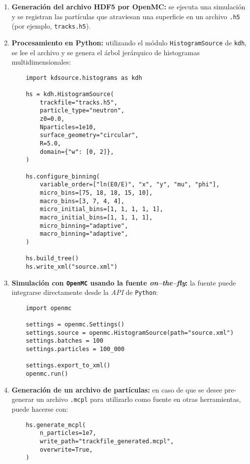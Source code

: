 \begin{enumerate}
    \item \textbf{Generación del archivo HDF5 por OpenMC:} se ejecuta una simulación y se registran las partículas que atraviesan una superficie en un archivo \texttt{.h5} (por ejemplo, \texttt{tracks.h5}).

    \item \textbf{Procesamiento en Python:} utilizando el módulo \texttt{HistogramSource} de \texttt{kdh}, se lee el archivo y se genera el árbol jerárquico de histogramas multidimensionales:
    
    \begin{verbatim}
    import kdsource.histograms as kdh

    hs = kdh.HistogramSource(
        trackfile="tracks.h5",
        particle_type="neutron",
        z0=0.0,
        Nparticles=1e10,
        surface_geometry="circular",
        R=5.0,
        domain={"w": [0, 2]},
    )

    hs.configure_binning(
        variable_order=["ln(E0/E)", "x", "y", "mu", "phi"],
        micro_bins=[75, 18, 18, 15, 10],
        macro_bins=[3, 7, 4, 4],
        micro_initial_bins=[1, 1, 1, 1, 1],
        macro_initial_bins=[1, 1, 1, 1],
        micro_binning="adaptive",
        macro_binning="adaptive",
    )

    hs.build_tree()
    hs.write_xml("source.xml")
    \end{verbatim}

    \item \textbf{Simulación con \texttt{OpenMC} usando la fuente \textit{on–the–fly}:} la fuente puede integrarse directamente desde la \textit{API} de \texttt{Python}:
    
    \begin{verbatim}
    import openmc

    settings = openmc.Settings()
    settings.source = openmc.HistogramSource(path="source.xml")
    settings.batches = 100
    settings.particles = 100_000

    settings.export_to_xml()
    openmc.run()
    \end{verbatim}

    \item \textbf{Generación de un archivo de partículas:} en caso de que se desee pre-generar un archivo \texttt{.mcpl} para utilizarlo como fuente en otras herramientas, puede hacerse con:
    
    \begin{verbatim}
    hs.generate_mcpl(
        n_particles=1e7,
        write_path="trackfile_generated.mcpl",
        overwrite=True,
    )
    \end{verbatim}
\end{enumerate}


